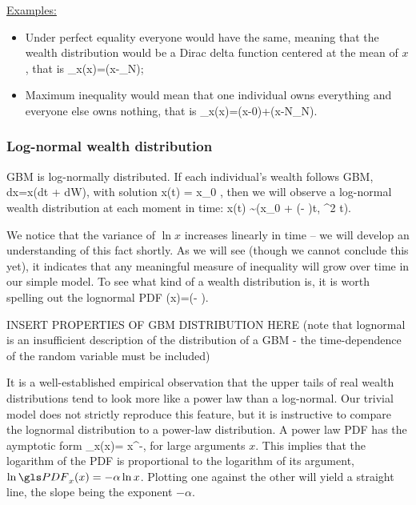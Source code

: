 \underline{Examples:}
\begin{itemize}
\item Under perfect equality everyone would have the same, meaning that the wealth
distribution would be a Dirac delta function centered at the mean of $x$, that is
\be
\PDF_x(x)=\delta(x-_N);
\ee
\item
Maximum inequality would mean that one individual owns everything
and everyone else owns nothing, that is
\be 
\PDF_x(x)=\delta(x-0)+\delta(x-N_N).
\ee
\end{itemize}

\subsubsection{Log-normal wealth distribution}
GBM is log-normally distributed. If each individual's wealth follows GBM,
\be
dx=x(\mu dt + \sigma dW),
\ee
with solution 
\be
x(t) = x_0 \exp{},
\ee
then we will observe a log-normal wealth distribution at each moment in time:
\be
\ln x(t) \sim {}\left(\ln x_0 + \left(\mu - \right)t, \sigma^2 t\right).
\ee


We notice that the variance of $\ln x$ increases linearly in time -- 
we will develop an understanding of this fact shortly. As we will see 
(though we cannot conclude this yet), it indicates that any meaningful 
measure of inequality will grow over time in our simple model. 
To see what kind of a wealth distribution  is, it is worth 
spelling out the lognormal PDF
\be
\PDF(x)=\exp\left(- \right).
\ee

INSERT PROPERTIES OF GBM DISTRIBUTION HERE (note that lognormal is an insufficient description of the distribution of a GBM - the time-dependence of the random variable must be included)

It is a well-established empirical observation \cite{Newman2005} that the upper tails of 
real wealth distributions tend to look more like a power law than a log-normal. Our trivial model does not
strictly reproduce this feature, but it is instructive to compare the lognormal distribution
to a power-law distribution. A power law PDF has the aymptotic form 
\be
\PDF_x(x)= x^{-\alpha},
\ee
for large arguments $x$. This implies that the logarithm of the PDF is proportional 
to the logarithm of its argument, $\ln \PDF_x(x) = -\alpha \ln x$. Plotting
one against the other will yield a straight line, the slope being the exponent $-\alpha$. 

